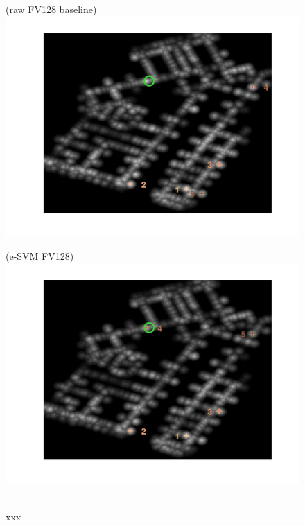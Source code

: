\documentclass[10pt,onecolumn,A4]{article}
\begin{document}
\begin{figure}
	\begin{minipage}{0.45\linewidth}
		\center
		(raw FV128 baseline) \\
		\includegraphics[trim = 55mm 40mm 55mm 25mm, clip=true,width=\linewidth]{sup2358/heatRaw.jpg}
	\end{minipage} 
	\begin{minipage}{0.45\linewidth}
		\center
		(e-SVM FV128) \\
		\includegraphics[trim = 55mm 40mm 55mm 25mm, clip=true,width=\linewidth]{sup2358/heatSvm.jpg}
	\end{minipage} 
	\\
	\textcolor{myWhite}{xxx}\\

\end{figure}
\end{document}
